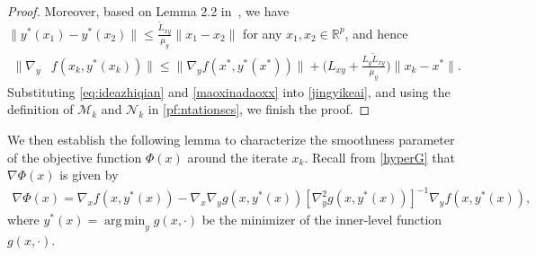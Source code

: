 \documentclass{osudissert96}
\DeclareMathOperator*{\argmin}{arg\,min}
\begin{document}
\begin{proof}
Moreover, based on Lemma 2.2 in~\cite{ghadimi2018approximation}, we have $\|y^*(x_1)-y^*(x_2)\|\leq \frac{\widetilde L_{xy}}{\mu_y} \|x_1-x_2\|$ for any $x_1,x_2\in\mathbb{R}^p$, and hence 
\begin{align}\label{maoxinadaoxx}
\|\nabla_y &f( x_k,y^*(x_k))\| \leq \|\nabla_y f( x^*,y^*(x^*))\| + \Big( L_{xy}+\frac{L_y\widetilde L_{xy}}{\mu_y}\Big)\|x_k-x^*\|.
\end{align}
Substituting \cref{eq:ideazhiqian}  and \cref{maoxinadaoxx} into \cref{jingyikeai}, and using the definition of  $\mathcal{M}_k$ and $\mathcal{N}_k$ in \cref{pf:ntationscs}, we finish the proof. 
\end{proof}
We then establish the following lemma to characterize the smoothness parameter of the objective function $\Phi(x)$ around the iterate $x_k$. 
Recall from \cref{hyperG} that $\nabla \Phi(x)$ is given by 
\begin{align}\label{hgforms}
\nabla \Phi(x) =  \nabla_x f(x,y^*(x)) -\nabla_x \nabla_y g(x,y^*(x)) [\nabla_y^2 g(x,y^*(x)) ]^{-1}\nabla_y f(x,y^*(x)),
\end{align}
where $y^*(x)=\argmin_{y}g(x,\cdot)$ be the minimizer of the inner-level function $g(x,\cdot)$. 
\end{document}
